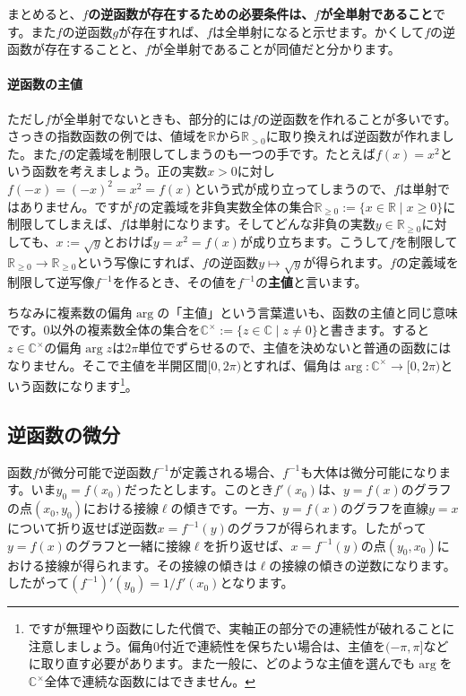 まとめると、\textbf{$f$の逆函数が存在するための必要条件は、$f$が全単射であること}です。また$f$の逆函数$g$が存在すれば、$f$は全単射になると示せます。かくして$f$の逆函数が存在することと、$f$が全単射であることが同値だと分かります。

\paragraph{逆函数の主値}

ただし$f$が全単射でないときも、部分的には$f$の逆函数を作れることが多いです。さっきの指数函数の例では、値域を$\mathbb{R}$から$\mathbb{R}_{>0}$に取り換えれば逆函数が作れました。また$f$の定義域を制限してしまうのも一つの手です。たとえば$f(x)=x^2$という函数を考えましょう。正の実数$x>0$に対し$f(-x)=(-x)^2=x^2=f(x)$という式が成り立ってしまうので、$f$は単射ではありません。ですが$f$の定義域を非負実数全体の集合$\mathbb{R}_{\geq 0}:=\{x\in\mathbb{R}\mid x\geq 0\}$に制限してしまえば、$f$は単射になります。そしてどんな非負の実数$y\in\mathbb{R}_{\geq 0}$に対しても、$x:=\sqrt{y}$とおけば$y=x^2=f(x)$が成り立ちます。こうして$f$を制限して$\mathbb{R}_{\geq 0}\rightarrow\mathbb{R}_{\geq 0}$という写像にすれば、$f$の逆函数$y\mapsto \sqrt{y}$が得られます。$f$の定義域を制限して逆写像$f^{-1}$を作るとき、その値を$f^{-1}$の\textbf{主値}と言います。

ちなみに複素数の偏角$\arg$の「主値」という言葉遣いも、函数の主値と同じ意味です。$0$以外の複素数全体の集合を$\mathbb{C}^{\times}:=\{ z\in\mathbb{C} \mid z\neq 0\}$と書きます。すると$z\in\mathbb{C}^{\times}$の偏角$\arg z$は$2\pi$単位でずらせるので、主値を決めないと普通の函数にはなりません。そこで主値を半開区間$[0,2\pi)$とすれば、偏角は$\arg\colon \mathbb{C}^{\times}\rightarrow[0,2\pi)$という函数になります\footnote{ですが無理やり函数にした代償で、実軸正の部分での連続性が破れることに注意しましょう。偏角$0$付近で連続性を保ちたい場合は、主値を$(-\pi,\pi]$などに取り直す必要があります。また一般に、どのような主値を選んでも$\arg$を$\mathbb{C}^{\times}$全体で連続な函数にはできません。}。

\subsection{逆函数の微分}

函数$f$が微分可能で逆函数$f^{-1}$が定義される場合、$f^{-1}$も大体は微分可能になります。いま$y_0=f(x_0)$だったとします。このとき$f'(x_0)$は、$y=f(x)$のグラフの点$(x_0,y_0)$における接線$\ell$の傾きです。一方、$y=f(x)$のグラフを直線$y=x$について折り返せば逆函数$x=f^{-1}(y)$のグラフが得られます。したがって$y=f(x)$のグラフと一緒に接線$\ell$を折り返せば、$x=f^{-1}(y)$の点$(y_0,x_0)$における接線が得られます。その接線の傾きは$\ell$の接線の傾きの逆数になります。したがって$(f^{-1})'(y_0)=1/f'(x_0)$となります。

